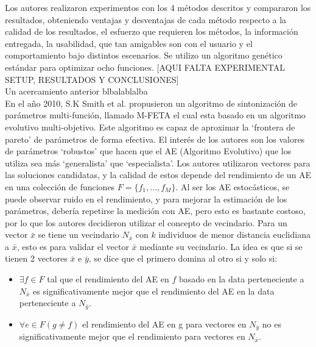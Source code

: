 \documentclass[letter, 10pt]{article}
\begin{document}
\begin{multicols}{2}
Los autores realizaron experimentos con los 4 métodos descritos y compararon los resultados, obteniendo ventajas y desventajas de cada método respecto a la calidad de los resultados, el esfuerzo que requieren los métodos, la información entregada, la usabilidad, que tan amigables son con el usuario y el comportamiento bajo distintos escenarios. Se utilizo un algoritmo genético estándar para optimizar ocho funciones. [AQUI FALTA EXPERIMENTAL SETUP, RESULTADOS Y CONCLUSIONES]\\


Un acercamiento anterior 
blbalablalba\\

En el año 2010, S.K Smith et al.\cite{Smit2010AnMM} propusieron un algoritmo de sintonización de parámetros multi-función, llamado M-FETA el cual esta basado en un algoritmo evolutivo multi-objetivo. Este algoritmo es capaz de aproximar la `frontera de pareto' de parámetros de forma efectiva. El interés de los autores son los valores de parámetros `robustos' que hacen que el AE (Algoritmo Evolutivo) que los utiliza sea más `generalista' que `especialista'. Los autores utilizaron vectores para las soluciones candidatas, y la calidad de estos depende del rendimiento de un AE en una colección de funciones $F=\{f_{1},...,f_{M}\}$. Al ser los AE estocásticos, se puede observar ruido en el rendimiento, y para mejorar la estimación de los parámetros, debería repetirse la medición con AE, pero esto es bastante costoso, por lo que los autores decidieron utilizar el concepto de vecindario. Para un vector $\bar{x}$ se tiene un vecindario $N_{\bar{x}}$ con $k$ individuos de menor distancia euclidiana a $\bar{x}$, esto es para validar el vector $\bar{x}$ mediante su vecindario. La idea es que si se tienen 2 vectores $\bar{x}$ e $\bar{y}$, se dice que el primero domina al otro si y solo si:
\begin{itemize}
    \item $\exists f \in F$ tal que el rendimiento del AE en $f$ basado en la data perteneciente a $N_{\bar{x}}$ es significativamente mejor que el rendimiento del AE en la data perteneciente a $N_{\bar{y}}$.
    \item $\forall e \in F (g \neq f)$ el rendimiento del AE en g para vectores en $N_{\bar{y}}$ no es significativamente mejor que el rendimiento para vectores en $N_{\bar{x}}$.
\end{itemize}

\end{multicols}
\end{document}
